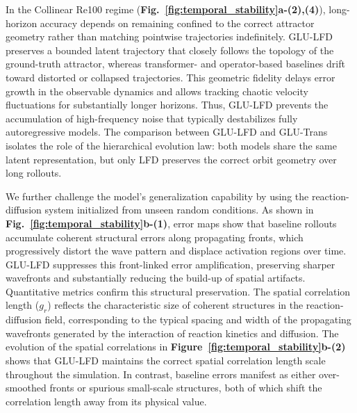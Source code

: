 \documentclass[pdflatex,sn-nature]{sn-jnl}%
\begin{document}
In the Collinear Re100 regime (\textbf{Fig.~\ref{fig:temporal_stability}a-(2),(4)}), long-horizon accuracy depends on remaining confined to the correct attractor geometry rather than matching pointwise trajectories indefinitely. 
GLU-LFD preserves a bounded latent trajectory that closely follows the topology of the ground-truth attractor, whereas transformer- and operator-based baselines drift toward distorted or collapsed trajectories. 
This geometric fidelity delays error growth in the observable dynamics and allows tracking chaotic velocity fluctuations for substantially longer horizons. 
Thus, GLU-LFD prevents the accumulation of high-frequency noise that typically destabilizes fully autoregressive models.
The comparison between GLU-LFD and GLU-Trans isolates the role of the hierarchical evolution law: both models share the same latent representation, but only LFD preserves the correct orbit geometry over long rollouts.

We further challenge the model's generalization capability by using the reaction-diffusion system initialized from unseen random conditions. 
As shown in \textbf{Fig.~\ref{fig:temporal_stability}b-(1)}, error maps show that baseline rollouts accumulate coherent structural errors along propagating fronts, which progressively distort the wave pattern and displace activation regions over time. 
GLU-LFD suppresses this front-linked error amplification, preserving sharper wavefronts and substantially reducing the build-up of spatial artifacts.
Quantitative metrics confirm this structural preservation. 
The spatial correlation length ($g_r$) reflects the characteristic size of coherent structures in the reaction-diffusion field, corresponding to the typical spacing and width of the propagating wavefronts generated by the interaction of reaction kinetics and diffusion. 
The evolution of the spatial correlations in \textbf{Figure~\ref{fig:temporal_stability}b-(2)} shows that GLU-LFD maintains the correct spatial correlation length scale throughout the simulation. 
In contrast, baseline errors manifest as either over-smoothed fronts or spurious small-scale structures, both of which shift the correlation length away from its physical value.
\end{document}

